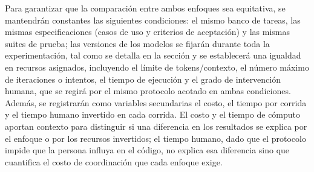 Para garantizar que la comparación entre ambos enfoques sea equitativa, se mantendrán constantes las siguientes condiciones: el mismo banco de tareas, las mismas especificaciones (casos de uso y criterios de aceptación) y las mismas suites de prueba; las versiones de los modelos se fijarán durante toda la experimentación, tal como se detalla en la sección  y se establecerá una igualdad en recursos asignados, incluyendo el límite de tokens/contexto, el número máximo de iteraciones o intentos, el tiempo de ejecución y el grado de intervención humana, que se regirá por el mismo protocolo acotado en ambas condiciones. Además, se registrarán como variables secundarias el costo, el tiempo por corrida y el tiempo humano invertido en cada corrida. El costo y el tiempo de cómputo aportan contexto para distinguir si una diferencia en los resultados se explica por el enfoque o por los recursos invertidos; el tiempo humano, dado que el protocolo impide que la persona influya en el código, no explica esa diferencia sino que cuantifica el costo de coordinación que cada enfoque exige.



